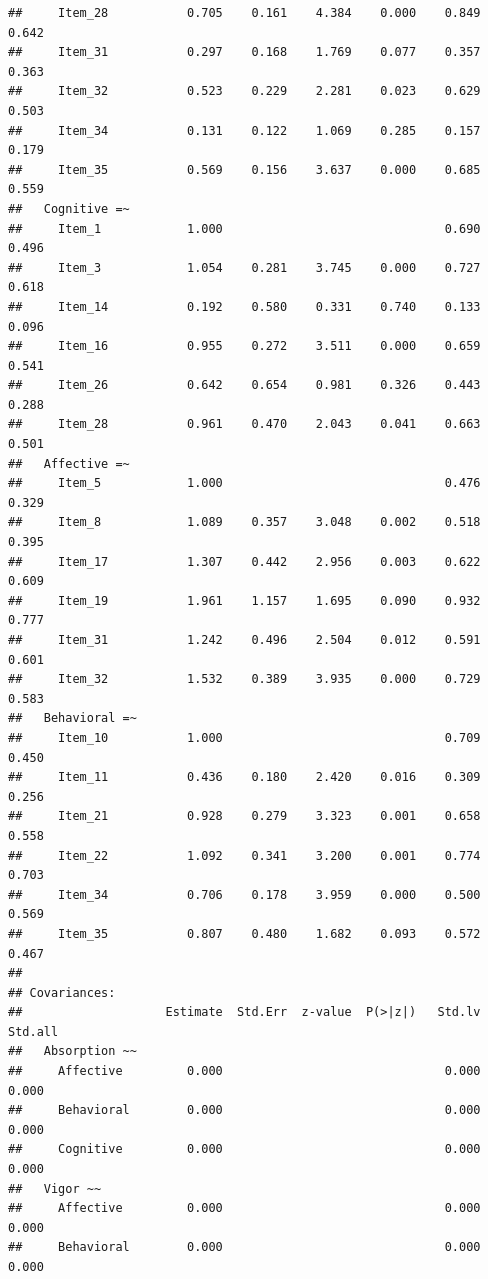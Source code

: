 \documentclass[
  english,
  man]{apa6}
\begin{document}
\begin{verbatim}
##     Item_28           0.705    0.161    4.384    0.000    0.849    0.642
##     Item_31           0.297    0.168    1.769    0.077    0.357    0.363
##     Item_32           0.523    0.229    2.281    0.023    0.629    0.503
##     Item_34           0.131    0.122    1.069    0.285    0.157    0.179
##     Item_35           0.569    0.156    3.637    0.000    0.685    0.559
##   Cognitive =~                                                          
##     Item_1            1.000                               0.690    0.496
##     Item_3            1.054    0.281    3.745    0.000    0.727    0.618
##     Item_14           0.192    0.580    0.331    0.740    0.133    0.096
##     Item_16           0.955    0.272    3.511    0.000    0.659    0.541
##     Item_26           0.642    0.654    0.981    0.326    0.443    0.288
##     Item_28           0.961    0.470    2.043    0.041    0.663    0.501
##   Affective =~                                                          
##     Item_5            1.000                               0.476    0.329
##     Item_8            1.089    0.357    3.048    0.002    0.518    0.395
##     Item_17           1.307    0.442    2.956    0.003    0.622    0.609
##     Item_19           1.961    1.157    1.695    0.090    0.932    0.777
##     Item_31           1.242    0.496    2.504    0.012    0.591    0.601
##     Item_32           1.532    0.389    3.935    0.000    0.729    0.583
##   Behavioral =~                                                         
##     Item_10           1.000                               0.709    0.450
##     Item_11           0.436    0.180    2.420    0.016    0.309    0.256
##     Item_21           0.928    0.279    3.323    0.001    0.658    0.558
##     Item_22           1.092    0.341    3.200    0.001    0.774    0.703
##     Item_34           0.706    0.178    3.959    0.000    0.500    0.569
##     Item_35           0.807    0.480    1.682    0.093    0.572    0.467
## 
## Covariances:
##                    Estimate  Std.Err  z-value  P(>|z|)   Std.lv  Std.all
##   Absorption ~~                                                         
##     Affective         0.000                               0.000    0.000
##     Behavioral        0.000                               0.000    0.000
##     Cognitive         0.000                               0.000    0.000
##   Vigor ~~                                                              
##     Affective         0.000                               0.000    0.000
##     Behavioral        0.000                               0.000    0.000

\end{verbatim}
\end{document}

